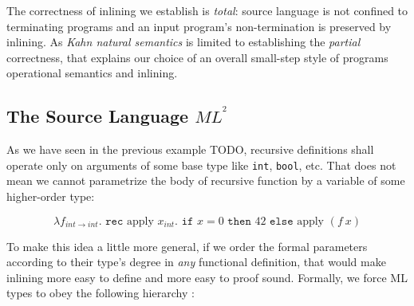 \documentclass[a4paper,11pt,oneside]{article}
\theoremstyle{plain}
\newcommand{\inlsrc}{\textit{ML}^{^2}}
\begin{document}
The correctness of inlining we establish is \textit{total}: source language is
not confined to terminating programs and an input program's non-termination is
preserved by inlining. As \textit{Kahn natural semantics} is limited to
establishing the \textit{partial} correctness, that explains our choice of an
overall small-step style of programs operational semantics and inlining.


\subsection{The Source Language \texorpdfstring{$\inlsrc$}{}}

As we have seen in the previous example TODO, recursive definitions shall
operate only on arguments of some base type like \texttt{int}, \texttt{bool},
etc. That does not mean we cannot parametrize the body of recursive function by
a variable of some higher-order type:
\begin{footnotesize}
$$ \lambda f_{int \rightarrow int}. \texttt{ rec } \text{apply } x_{int} .
  \texttt{ if } x = 0 \texttt{ then } 42 \texttt{ else} \text{ apply } (f~x)$$
\end{footnotesize}
To make this idea a little more general, if we order the formal
parameters according to their type's degree in \textit{any} functional
definition, that would make inlining more easy to define 
and more easy to proof sound. 
Formally, we force ML types to obey the following hierarchy :
\end{document}
